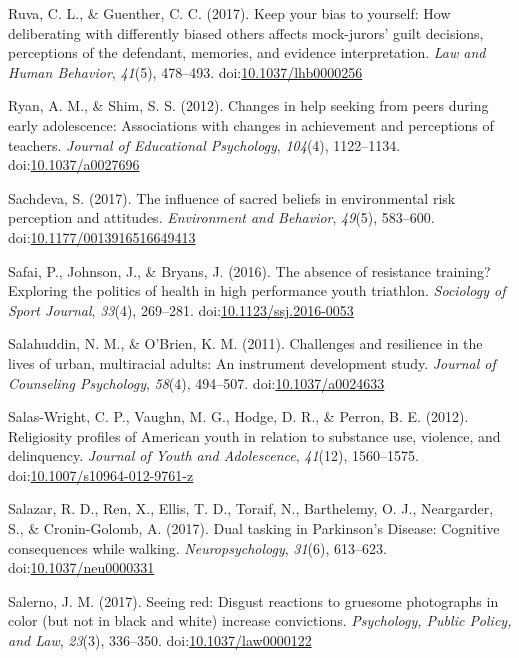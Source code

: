 \documentclass[english,man]{apa6}
\theoremstyle{definition}
\theoremstyle{definition}
\theoremstyle{definition}
\theoremstyle{remark}
\begin{document}
\hypertarget{ref-Ruva2017}{}
Ruva, C. L., \& Guenther, C. C. (2017). Keep your bias to yourself: How
deliberating with differently biased others affects mock-jurors' guilt
decisions, perceptions of the defendant, memories, and evidence
interpretation. \emph{Law and Human Behavior}, \emph{41}(5), 478--493.
doi:\href{https://doi.org/10.1037/lhb0000256}{10.1037/lhb0000256}

\hypertarget{ref-Ryan2012}{}
Ryan, A. M., \& Shim, S. S. (2012). Changes in help seeking from peers
during early adolescence: Associations with changes in achievement and
perceptions of teachers. \emph{Journal of Educational Psychology},
\emph{104}(4), 1122--1134.
doi:\href{https://doi.org/10.1037/a0027696}{10.1037/a0027696}

\hypertarget{ref-Sachdeva2017}{}
Sachdeva, S. (2017). The influence of sacred beliefs in environmental
risk perception and attitudes. \emph{Environment and Behavior},
\emph{49}(5), 583--600.
doi:\href{https://doi.org/10.1177/0013916516649413}{10.1177/0013916516649413}

\hypertarget{ref-Safai2016}{}
Safai, P., Johnson, J., \& Bryans, J. (2016). The absence of resistance
training? Exploring the politics of health in high performance youth
triathlon. \emph{Sociology of Sport Journal}, \emph{33}(4), 269--281.
doi:\href{https://doi.org/10.1123/ssj.2016-0053}{10.1123/ssj.2016-0053}

\hypertarget{ref-Salahuddin2011}{}
Salahuddin, N. M., \& O'Brien, K. M. (2011). Challenges and resilience
in the lives of urban, multiracial adults: An instrument development
study. \emph{Journal of Counseling Psychology}, \emph{58}(4), 494--507.
doi:\href{https://doi.org/10.1037/a0024633}{10.1037/a0024633}

\hypertarget{ref-Salas-Wright2012}{}
Salas-Wright, C. P., Vaughn, M. G., Hodge, D. R., \& Perron, B. E.
(2012). Religiosity profiles of American youth in relation to substance
use, violence, and delinquency. \emph{Journal of Youth and Adolescence},
\emph{41}(12), 1560--1575.
doi:\href{https://doi.org/10.1007/s10964-012-9761-z}{10.1007/s10964-012-9761-z}

\hypertarget{ref-Salazar2017}{}
Salazar, R. D., Ren, X., Ellis, T. D., Toraif, N., Barthelemy, O. J.,
Neargarder, S., \& Cronin-Golomb, A. (2017). Dual tasking in Parkinson's
Disease: Cognitive consequences while walking. \emph{Neuropsychology},
\emph{31}(6), 613--623.
doi:\href{https://doi.org/10.1037/neu0000331}{10.1037/neu0000331}

\hypertarget{ref-Salerno2017}{}
Salerno, J. M. (2017). Seeing red: Disgust reactions to gruesome
photographs in color (but not in black and white) increase convictions.
\emph{Psychology, Public Policy, and Law}, \emph{23}(3), 336--350.
doi:\href{https://doi.org/10.1037/law0000122}{10.1037/law0000122}
\end{document}

